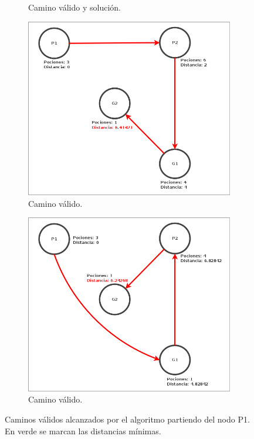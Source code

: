 \begin{figure}[H]
\begin{subfigure}[b]{0.49\textwidth}
        \caption{Camino válido y solución.}
        \label{fig: ejercicio1_ejemplo_camino1_2}
    \end{subfigure}
    \begin{subfigure}[b]{0.49\textwidth}
        \includegraphics[width=\linewidth]{img/ejercicio1/ejercicio1_ejemplo_camino1_3.png}
        \caption{Camino válido.}
        \label{fig: ejercicio1_ejemplo_camino1_3}
    \end{subfigure}
    \begin{subfigure}[b]{0.49\textwidth}
        \includegraphics[width=\linewidth]{img/ejercicio1/ejercicio1_ejemplo_camino1_4.png}
        \caption{Camino válido.}
        \label{fig: ejercicio1_ejemplo_camino1_4}
    \end{subfigure}
    \caption{Caminos válidos alcanzados por el algoritmo partiendo del nodo P1. En verde se marcan las distancias mínimas.}
    \label{fig: ejercicio1_ejemplo_caminos1}
\end{figure}

